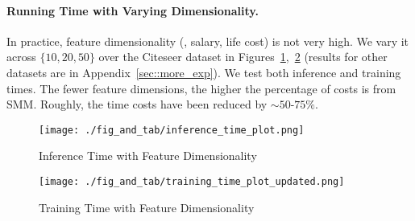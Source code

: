 

\paragraph{Running Time with Varying Dimensionality.}
In practice, feature dimensionality (\eg, salary, life cost) is not very high.
We vary it across $\{10, 20, 50\}$ over the Citeseer dataset in Figures~\ref{fig:time_fea_dim_inference_cite},~\ref{fig:time_fea_dim_train_cite} (results for other datasets are in Appendix~\ref{sec::more_exp}).
We test both inference and training times.
The fewer feature dimensions, the higher the percentage of costs is from SMM.
Roughly, the time costs have been reduced by ${\sim}50$-$75\%$.



\begin{figure}[!t]
	\centering
	\texttt{[image: ./fig\_and\_tab/inference\_time\_plot.png]}
		\caption{Inference Time with Feature Dimensionality}
 	\label{fig:time_fea_dim_inference_cite}
\end{figure}
\begin{figure}[!t]
	\centering
	\texttt{[image: ./fig\_and\_tab/training\_time\_plot\_updated.png]}
		\caption{Training Time with  Feature Dimensionality}
 	\label{fig:time_fea_dim_train_cite}
\end{figure}


